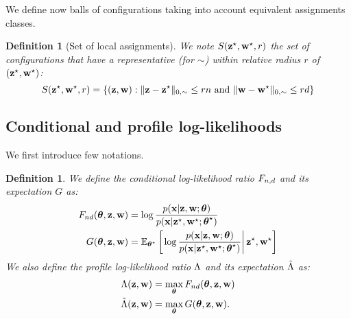 \documentclass[bj]{imsart}
\numberwithin{equation}{section}
\theoremstyle{plain}
\newtheorem{dof}[thm]{Definition}
\theoremstyle{remark}
\begin{document}
We define now balls of configurations taking into account equivalent assignments classes.
\begin{dof}[Set of local assignments]
  \label{prop:small-deviations-profile-likelihood}
  We note $S(\mathbf{z}^\star, \mathbf{w}^\star, r)$ the set of configurations that have a representative (for $\sim$) within relative radius $r$ of $(\mathbf{z}^\star, \mathbf{w}^\star)$:
  \begin{equation*}
    S(\bzs, \bws, r) = \left\{ (\bz, \bw) : \|\bz - \bzs\|_{0, \sim} \leq r \n \text{ and } \|\bw - \bws\|_{0, \sim} \leq r \dd \right\}
  \end{equation*}
\end{dof}

\subsection{Conditional and profile log-likelihoods}
\label{sec:cond-and-prof-likelihood} 
%
We first introduce few notations.

\begin{dof}
\label{def:conditional-profile-likelihood}
We define the conditional log-likelihood ratio $F_{n,d}$ and its expectation $G$ as:
\begin{equation}
  \label{eq:conditional-likelihood}
  \begin{aligned}
    \Fnd(\btheta, \bz, \bw) & = \log \frac{\prob(\bx| \bz,\bw;\btheta)}{\prob(\bx| \bzs,\bws;\bthetas)} \\
    \G(\btheta, \bz, \bw) & = \Esp_{\bthetas} \left[ \left. \log \frac{\prob(\bx| \bz,\bw;\btheta)}{\prob(\bx| \bzs,\bws;\bthetas)} \right| \bzs, \bws  \right] \\
  \end{aligned}
\end{equation}
We also define the profile log-likelihood ratio $\Lambda$ and its expectation $\tilde{\Lambda}$ as:
\begin{equation}
  \label{eq:profile-likelihood}
  \begin{aligned}
    \Lamb(\bz, \bw) & = \max_{\btheta} \Fnd(\btheta, \bz, \bw)  \\
    \Lambtilde(\bz, \bw) & = \max_{\btheta} \G(\btheta, \bz, \bw).
  \end{aligned}
\end{equation}
\end{dof}
\end{document}
